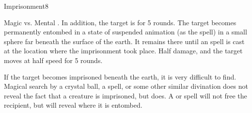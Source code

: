 \begin{spellsection}{Imprisonment}{8}
    \begin{spellheader}
    \end{spellheader}
    \begin{spellcontent}
        \begin{spelltargetinginfo}
        \end{spelltargetinginfo}
        \begin{spelleffects}
            \begin{spellattack}{Magic vs. Mental}
                \spellsuccess {}. In addition, the target is \slowed for 5 rounds.
                \spellcritical The target becomes permanently entombed in a state of suspended animation (as the  spell) in a small sphere far beneath the surface of the earth. It remains there until an  spell is cast at the location where the imprisonment took place.
                \spellfailure Half damage, and the target moves at half speed for 5 rounds.
            \end{spellattack}
        \end{spelleffects}
    \end{spellcontent}
    \begin{spellfooter}
        \spellnotes If the target becomes imprisoned beneath the earth, it is very difficult to find. Magical search by a crystal ball, a  spell, or some other similar divination does not reveal the fact that a creature is imprisoned, but  does. A  or  spell will not free the recipient, but will reveal where it is entombed.
        \miscastrandom
    \end{spellfooter}
\end{spellsection}

